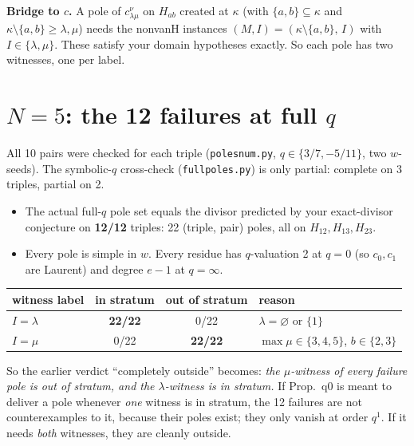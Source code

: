 \documentclass[10pt]{article}
\begin{document}
\textbf{Bridge to $c$.} A pole of $c^\nu_{\lambda\mu}$ on $H_{ab}$ created at $\kappa$ (with $\{a,b\}\subseteq\kappa$ and $\kappa\setminus\{a,b\}\ge\lambda,\mu$) needs
the nonvanH instances $(M,I)=(\kappa\setminus\{a,b\},\,I)$ with $I\in\{\lambda,\mu\}$. These satisfy your domain hypotheses exactly. So each pole has two
witnesses, one per label.

\section*{$N=5$: the 12 failures at full $q$}
All 10 pairs were checked for each triple (\texttt{polesnum.py}, $q\in\{3/7,-5/11\}$, two $w$-seeds). The symbolic-$q$ cross-check (\texttt{fullpoles.py}) is
only partial: complete on 3 triples, partial on 2.
\begin{itemize}
\item The actual full-$q$ pole set equals the divisor predicted by your exact-divisor conjecture on \textbf{12/12} triples: 22 (triple, pair) poles, all on
$H_{12},H_{13},H_{23}$.
\item Every pole is simple in $w$. Every residue has $q$-valuation 2 at $q=0$ (so $c_0,c_1$ are Laurent) and degree $e-1$ at $q=\infty$.
\end{itemize}
\begin{center}\small
\begin{tabular}{@{}lccl@{}}\toprule
witness label & in stratum & out of stratum & reason\\\midrule
$I=\lambda$ & \textbf{22/22} & 0/22 & $\lambda=\varnothing$ or $\{1\}$\\
$I=\mu$ & 0/22 & \textbf{22/22} & $\max\mu\in\{3,4,5\}$, $b\in\{2,3\}$\\\bottomrule
\end{tabular}
\end{center}
So the earlier verdict ``completely outside'' becomes: \emph{the $\mu$-witness of every failure pole is out of stratum, and the $\lambda$-witness is in
stratum.} If Prop.~q0 is meant to deliver a pole whenever \emph{one} witness is in stratum, the 12 failures are not counterexamples to it, because their poles
exist; they only vanish at order $q^1$. If it needs \emph{both} witnesses, they are cleanly outside.
\end{document}
